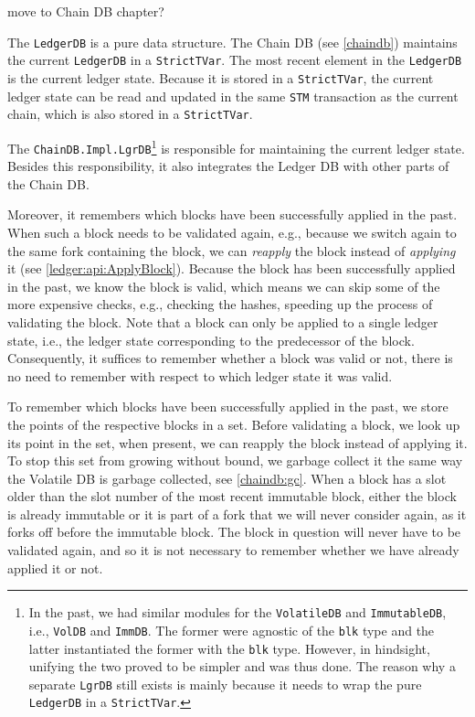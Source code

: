  move to Chain DB chapter?

The \lstinline!LedgerDB! is a pure data structure. The Chain DB (see
\cref{chaindb}) maintains the current \lstinline!LedgerDB! in a
\lstinline!StrictTVar!. The most recent element in the \lstinline!LedgerDB! is
the current ledger state. Because it is stored in a \lstinline!StrictTVar!, the
current ledger state can be read and updated in the same \lstinline!STM!
transaction as the current chain, which is also stored in a
\lstinline!StrictTVar!.

The \lstinline!ChainDB.Impl.LgrDB!\footnote{In the past, we had similar modules
for the \lstinline!VolatileDB! and \lstinline!ImmutableDB!, i.e.,
\lstinline!VolDB! and \lstinline!ImmDB!. The former were agnostic of the
\lstinline!blk! type and the latter instantiated the former with the
\lstinline!blk! type. However, in hindsight, unifying the two proved to be
simpler and was thus done. The reason why a separate \lstinline!LgrDB! still
exists is mainly because it needs to wrap the pure \lstinline!LedgerDB! in a
\lstinline!StrictTVar!.} is responsible for maintaining the current ledger
state. Besides this responsibility, it also integrates the Ledger DB with other
parts of the Chain DB.

Moreover, it remembers which blocks have been successfully applied in the past.
When such a block needs to be validated again, e.g., because we switch again to
the same fork containing the block, we can \emph{reapply} the block instead of
\emph{applying} it (see \cref{ledger:api:ApplyBlock}). Because the block has
been successfully applied in the past, we know the block is valid, which means
we can skip some of the more expensive checks, e.g., checking the hashes,
speeding up the process of validating the block. Note that a block can only be
applied to a single ledger state, i.e., the ledger state corresponding to the
predecessor of the block. Consequently, it suffices to remember whether a block
was valid or not, there is no need to remember with respect to which ledger
state it was valid.

To remember which blocks have been successfully applied in the past, we store
the points of the respective blocks in a set. Before validating a block, we look
up its point in the set, when present, we can reapply the block instead of
applying it. To stop this set from growing without bound, we garbage collect it
the same way the Volatile DB is garbage collected, see \cref{chaindb:gc}. When a
block has a slot older than the slot number of the most recent immutable block,
either the block is already immutable or it is part of a fork that we will never
consider again, as it forks off before the immutable block. The block in question will never have to be validated again, and
so it is not necessary to remember whether we have already applied it or not.
